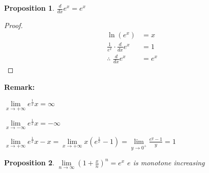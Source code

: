 \documentclass[12pt]{article}
\theoremstyle{plain}
\newtheorem{proposition}{Proposition}[subsection]
\newcommand{\dlim}{\displaystyle\lim\limits}
\begin{document}
    \begin{proposition}
        $\frac d{dx} e^x = e^x$
    \end{proposition}
    \begin{proof}
        \begin{align*}
            \ln (e^x) &= x\\
            \frac1{e^x} \cdot \frac{d}{dx} e^x &= 1\\
            \therefore\,\, \frac d{dx} e^x&=e^x
        \end{align*}
    \end{proof}

    \textbf{Remark:} 
    \begin{description}
        \item $\dlim_{x\to+\infty} e^{\frac1x}x =\infty$
        \item $\dlim_{x\to -\infty} e^{\frac 1x}x =-\infty$
        \item $\dlim_{x\to+\infty} e^{\frac1x} x-x 
            =\dlim_{x\to+\infty} x(e^{\frac1x }-1) 
            =\dlim_{y\to 0^+} \frac{e^y -1} y =1$
    \end{description}

    \begin{proposition}
        $\dlim_{n\to\infty} (1+\frac xn)^n = e^x$ \qquad $e$ is monotone 
        increasing
    \end{proposition}
\end{document}

